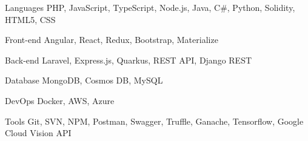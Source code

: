 

\begin{cvskills}

  \cvskill
    {Languages} %
    {PHP, JavaScript, TypeScript, Node.js, Java, C\#, Python, Solidity, HTML5, CSS} %

  \cvskill
    {Front-end} %
    {Angular, React, Redux, Bootstrap, Materialize} %

  \cvskill
    {Back-end} %
    {Laravel, Express.js, Quarkus, REST API, Django REST} %

  \cvskill
    {Database} %
    {MongoDB, Cosmos DB, MySQL} %

  \cvskill
    {DevOps} %
    {Docker, AWS, Azure} %

  \cvskill
    {Tools} %
    {Git, SVN, NPM, Postman, Swagger, Truffle, Ganache, Tensorflow, Google Cloud Vision API} %

\end{cvskills}